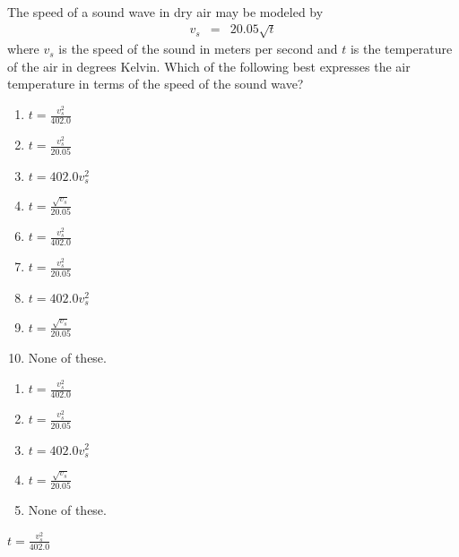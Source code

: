  
The speed of a sound wave in dry air may be modeled by 
\begin{eqnarray*}
v_s &=& 20.05 \sqrt{t} 
\end{eqnarray*} 
where $v_s$ is the speed of the sound in meters per second and $t$ is the temperature of the air in degrees Kelvin.  Which of the following best expresses the air temperature in terms of the speed of the sound wave?


\ifsat
	\begin{enumerate}[label=\Alph*)]
		\item $t=\frac{v_s^2}{402.0} $ %
		\item $t=\frac{v_s^2}{20.05} $ 
		\item $t=402.0v_s^2 $ 
		\item $t=\frac{\sqrt{v_s}}{20.05} $
	\end{enumerate}
\else
\fi

\ifacteven
	\begin{enumerate}[label=\textbf{\Alph*.},itemsep=\fill,align=left]
		\setcounter{enumii}{5}
		\item $t=\frac{v_s^2}{402.0} $ %
		\item $t=\frac{v_s^2}{20.05} $ 
		\item $t=402.0v_s^2 $ 
		\addtocounter{enumii}{1}
		\item $t=\frac{\sqrt{v_s}}{20.05} $
		\item None of these. 
	\end{enumerate}
\else
\fi

\ifactodd
	\begin{enumerate}[label=\textbf{\Alph*.},itemsep=\fill,align=left]
		\item $t=\frac{v_s^2}{402.0} $ %
		\item $t=\frac{v_s^2}{20.05} $ 
		\item $t=402.0v_s^2 $ 
		\item $t=\frac{\sqrt{v_s}}{20.05} $
		\item None of these. 
	\end{enumerate}
\else
\fi

\ifgridin
 $t=\frac{v_s^2}{402.0} $ %
		
\else
\fi

